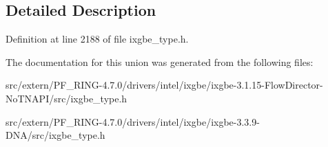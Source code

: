 \subsection{Detailed Description}


Definition at line 2188 of file ixgbe\_\-type.h.



The documentation for this union was generated from the following files:\begin{DoxyCompactItemize}
\item 
src/extern/PF\_\-RING-\/4.7.0/drivers/intel/ixgbe/ixgbe-\/3.1.15-\/FlowDirector-\/NoTNAPI/src/ixgbe\_\-type.h\item 
src/extern/PF\_\-RING-\/4.7.0/drivers/intel/ixgbe/ixgbe-\/3.3.9-\/DNA/src/ixgbe\_\-type.h\end{DoxyCompactItemize}
